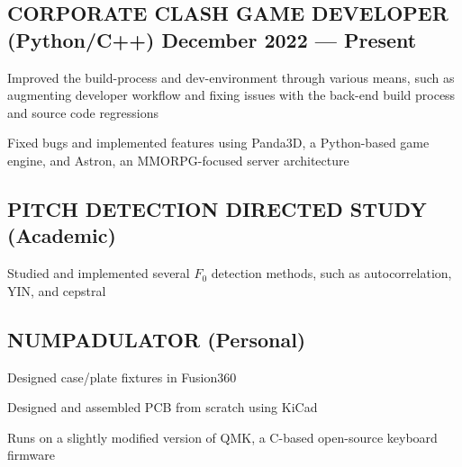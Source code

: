 \documentclass[letter,10pt]{article}
\begin{document}
\subsection{{CORPORATE CLASH GAME DEVELOPER (Python/C++)} \hfill December 2022 --- Present}
\begin{zitemize}
\item Improved the build-process and dev-environment through various means, such as augmenting developer workflow and fixing issues with the back-end build process and source code regressions
\item Fixed bugs and implemented features using Panda3D, a Python-based game engine, and Astron, an MMORPG-focused server architecture
\end{zitemize}

\subsection{{PITCH DETECTION DIRECTED STUDY (Academic)} \hfill {}}
\begin{zitemize}
\item Studied and implemented several $F_0$ detection methods, such as autocorrelation, YIN, and cepstral
\end{zitemize}

\subsection{{NUMPADULATOR (Personal)} \hfill {}}
\begin{zitemize}
\item Designed case/plate fixtures in Fusion360
\item Designed and assembled PCB from scratch using KiCad
\item Runs on a slightly modified version of QMK, a C-based open-source keyboard firmware
\end{zitemize}
\end{document}
